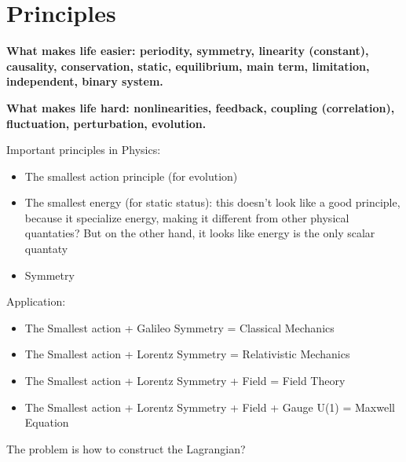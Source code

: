 \section{Principles}
\textbf{What makes life easier: periodity, symmetry, linearity (constant), 
causality, conservation, static, equilibrium, main term, limitation, 
independent, binary system.}

\textbf{What makes life hard: nonlinearities, feedback, coupling (correlation),
fluctuation, perturbation, evolution.}

\bigskip
Important principles in Physics:
\begin{itemize}
    \item The smallest action principle (for evolution)
    \item The smallest energy (for static status): this doesn't look like a good
	principle, because it specialize energy, making it different from other
	physical quantaties? But on the other hand, it looks like energy is the
	only scalar quantaty 
    \item Symmetry
\end{itemize}

Application:
\begin{itemize}
    \item The Smallest action + Galileo Symmetry = Classical Mechanics
    \item The Smallest action + Lorentz Symmetry = Relativistic Mechanics
    \item The Smallest action + Lorentz Symmetry + Field = Field Theory
    \item The Smallest action + Lorentz Symmetry + Field + Gauge U(1) = Maxwell Equation
\end{itemize}
The problem is how to construct the Lagrangian?

